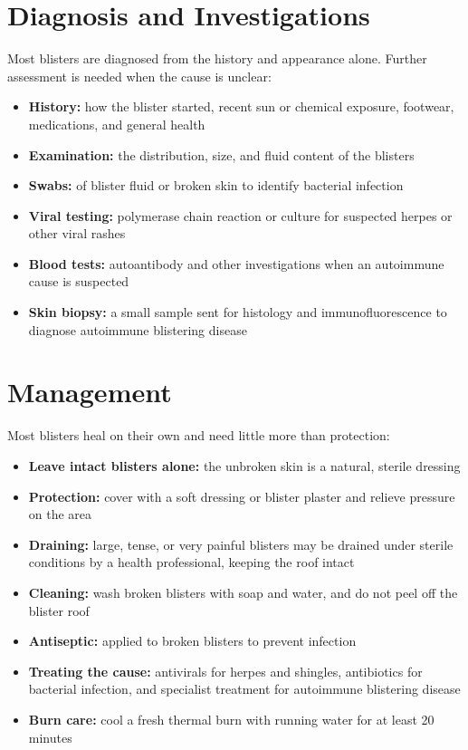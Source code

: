\section*{Diagnosis and Investigations}
Most blisters are diagnosed from the history and appearance alone. Further assessment is needed when the cause is unclear:

\begin{itemize}
    \item \textbf{History:} how the blister started, recent sun or chemical exposure, footwear, medications, and general health
    \item \textbf{Examination:} the distribution, size, and fluid content of the blisters
    \item \textbf{Swabs:} of blister fluid or broken skin to identify bacterial infection
    \item \textbf{Viral testing:} polymerase chain reaction or culture for suspected herpes or other viral rashes
    \item \textbf{Blood tests:} autoantibody and other investigations when an autoimmune cause is suspected
    \item \textbf{Skin biopsy:} a small sample sent for histology and immunofluorescence to diagnose autoimmune blistering disease
\end{itemize}

\section*{Management}
Most blisters heal on their own and need little more than protection:

\begin{itemize}
    \item \textbf{Leave intact blisters alone:} the unbroken skin is a natural, sterile dressing
    \item \textbf{Protection:} cover with a soft dressing or blister plaster and relieve pressure on the area
    \item \textbf{Draining:} large, tense, or very painful blisters may be drained under sterile conditions by a health professional, keeping the roof intact
    \item \textbf{Cleaning:} wash broken blisters with soap and water, and do not peel off the blister roof
    \item \textbf{Antiseptic:} applied to broken blisters to prevent infection
    \item \textbf{Treating the cause:} antivirals for herpes and shingles, antibiotics for bacterial infection, and specialist treatment for autoimmune blistering disease
    \item \textbf{Burn care:} cool a fresh thermal burn with running water for at least 20 minutes
\end{itemize}


